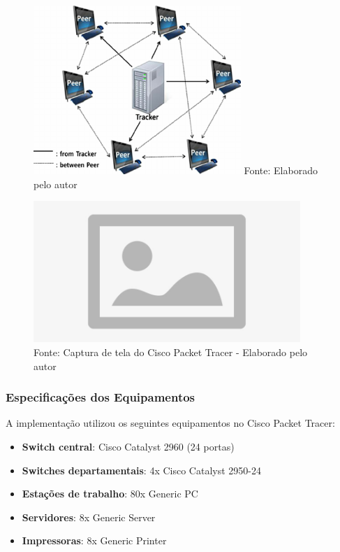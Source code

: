 \begin{figure}[H]
\centering
{}
\includegraphics[width=0.7\textwidth]{figure/peer-to-peer.png}
\label{fig:peer_to_peer}
{\fontsize{10pt}{\baselineskip}\selectfont
Fonte: Elaborado pelo autor}
\end{figure}

\begin{figure}[H]
\centering
{}
\includegraphics[width=0.9\textwidth]{figure/placeholder.jpg}
\label{fig:topologia_supertech}
{\fontsize{10pt}{\baselineskip}\selectfont
Fonte: Captura de tela do Cisco Packet Tracer - Elaborado pelo autor}
\end{figure}

\subsubsection{Especificações dos Equipamentos}

A implementação utilizou os seguintes equipamentos no Cisco Packet Tracer:

\begin{itemize}
    \item \textbf{Switch central}: Cisco Catalyst 2960 (24 portas)
    \item \textbf{Switches departamentais}: 4x Cisco Catalyst 2950-24
    \item \textbf{Estações de trabalho}: 80x Generic PC
    \item \textbf{Servidores}: 8x Generic Server
    \item \textbf{Impressoras}: 8x Generic Printer
\end{itemize}

